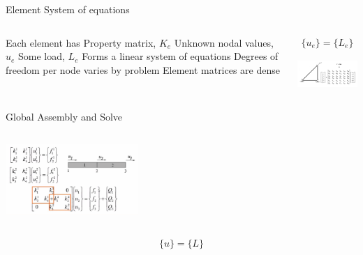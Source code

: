 \begin{frame}{Element System of equations}
\begin{columns}
\begin{outline}
\1 Each element has
\2 Property matrix, $K_e$
\2 Unknown nodal values, $u_e$
\2 Some load, $L_e$
\1 Forms a linear system of equations
\1 Degrees of freedom per node varies by problem
\1 Element matrices are dense
\end{outline}

\begin{center}
  \begin{align*}
    [K_e]\{u_e\} = \{L_e\}
  \end{align*}

  \vspace{1cm}

  \includegraphics[width=5.5cm]{displacement_system.png}
\end{center}
\end{columns}
\end{frame}

\begin{frame}{Global Assembly and Solve}
  \begin{columns}
  \begin{center}
    \includegraphics[width=5cm]{two_element_example.png}
  \end{center}

  \begin{center}
  \end{center}
  \end{columns}
  \begin{center}
\begin{align*}
    [K]\{u\} = \{L\}
  \end{align*}
  \end{center}
\end{frame}


